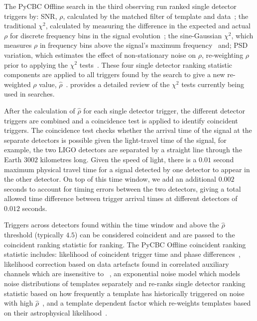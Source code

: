 The PyCBC Offline search in the third observing run ranked single detector triggers by: SNR, $\rho$, calculated by the matched filter of template and data~\cite{FINDCHIRP:2012}; the traditional $\chi^{2}$, calculated by measuring the difference in the expected and actual $\rho$ for discrete frequency bins in the signal evolution~\cite{Allen_Chi:2005}; the sine-Gaussian $\chi^{2}$, which measures $\rho$ in frequency bins above the signal's maximum frequency~\cite{PyCBC_sg:2018} and; PSD variation, which estimates the effect of non-stationary noise on $\rho$, re-weighting $\rho$ prior to applying the $\chi^{2}$ tests~\cite{PSD_var:2020}. These four single detector ranking statistic components are applied to all triggers found by the search to give a new re-weighted $\rho$ value, $\hat{\rho}$~\cite{rw_snr_eq:2012}. \cite{Chatziioannou:2024} provides a detailed review of the $\chi^{2}$ tests currently being used in \gwadj searches.

After the calculation of $\hat{\rho}$ for each single detector trigger, the different detector triggers are combined and a coincidence test is applied to identify coincident triggers. The coincidence test checks whether the arrival time of the \gwadj signal at the separate detectors is possible given the light-travel time of the \gwadj signal, for example, the two LIGO detectors are separated by a straight line through the Earth $3002$ kilometres long. Given the speed of light, there is a $0.01$ second maximum physical travel time for a signal detected by one detector to appear in the other detector. On top of this time window, we add an additional $0.002$ seconds to account for timing errors between the two detectors, giving a total allowed time difference between trigger arrival times at different detectors of $0.012$ seconds.

Triggers across detectors found within the time window and above the $\hat{\rho}$ threshold (typically $4.5$) can be considered coincident and are passed to the coincident ranking statistic for ranking. The PyCBC Offline coincident ranking statistic includes: likelihood of coincident trigger time and phase differences~\cite{PyCBC:2016}, likelihood correction based on data artefacts found in correlated auxiliary channels which are insensitive to \gws~\cite{DQ_vetoes:2017, iDQ:2020}, an exponential noise model which models noise distributions of templates separately and re-ranks single detector ranking statistic based on how frequently a template has historically triggered on noise with high $\hat{\rho}$~\cite{PyCBC:2017}, and a template dependent factor which re-weights templates based on their astrophysical likelihood~\cite{PyCBC_focussed_bbh:2024}.

